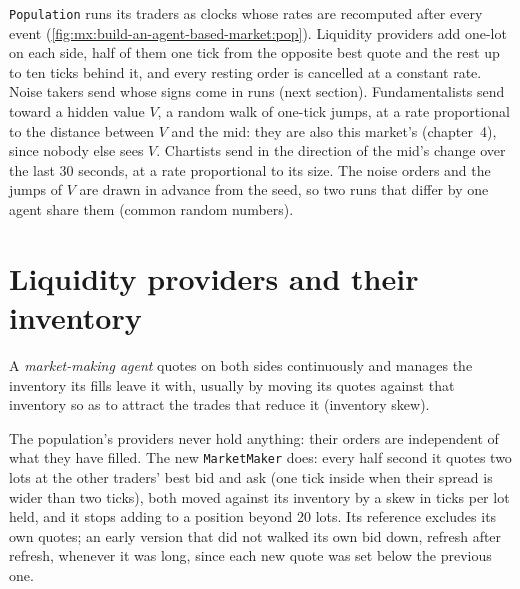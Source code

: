 \texttt{Population} runs its traders as clocks whose rates are recomputed after every event
(\cref{fig:mx:build-an-agent-based-market:pop}). Liquidity providers add one-lot  on each side, half of them one tick from the opposite
best quote and the rest up to ten ticks behind it, and every resting order is cancelled at a constant rate. Noise takers send  whose signs
come in runs (next section). Fundamentalists send  toward a hidden value $V$, a random walk of one-tick jumps, at a rate proportional to
the distance between $V$ and the mid: they are also this market's  (chapter~4), since nobody else sees $V$. Chartists send  in the direction of the mid's change over the last 30 seconds, at a rate proportional to its size. The noise orders and the jumps of $V$ are
drawn in advance from the seed, so two runs that differ by one agent share them (common random numbers).

\label{lst:mx:build-an-agent-based-market:pop}

\section{Liquidity providers and their inventory}

\begin{definition}\label{def:mx:build-an-agent-based-market:mm}
A \emph{market-making agent} quotes on both sides continuously and manages the inventory its fills leave it with, usually by
moving its quotes against that inventory so as to attract the trades that reduce it (inventory skew).
\end{definition}

The population's providers never hold anything: their orders are independent of what they have filled. The new \texttt{MarketMaker} does: every half
second it quotes two lots at the other traders' best bid and ask (one tick inside when their spread is wider than two ticks), both moved against its
inventory by a skew in ticks per lot held, and it stops adding to a position beyond 20 lots. Its reference excludes its own quotes; an early version
that did not walked its own bid down, refresh after refresh, whenever it was long, since each new quote was set below the previous one.

